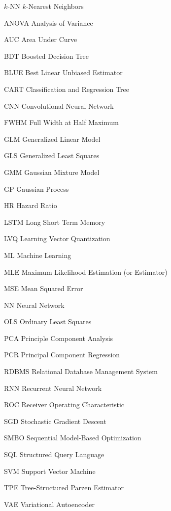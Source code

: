 \begin{symbollist}
	\item[$k$-NN] $k$-Nearest Neighbors
	\item[ANOVA] Analysis of Variance
	\item[AUC] Area Under Curve
	\item[BDT] Boosted Decision Tree
	\item[BLUE] Best Linear Unbiased Estimator
	\item[CART] Classification and Regression Tree
	\item[CNN] Convolutional Neural Network
	\item[FWHM] Full Width at Half Maximum
	\item[GLM] Generalized Linear Model
	\item[GLS] Generalized Least Squares
	\item[GMM] Gaussian Mixture Model
	\item[GP] Gaussian Process
	\item[HR] Hazard Ratio
	\item[LSTM] Long Short Term Memory
	\item[LVQ] Learning Vector Quantization
	\item[ML] Machine Learning
	\item[MLE] Maximum Likelihood Estimation (or Estimator)
	\item[MSE] Mean Squared Error
	\item[NN] Neural Network
	\item[OLS] Ordinary Least Squares
	\item[PCA] Principle Component Analysis
	\item[PCR] Principal Component Regression
	\item[RDBMS] Relational Database Management System
	\item[RNN] Recurrent Neural Network
	\item[ROC] Receiver Operating Characteristic
	\item[SGD] Stochastic Gradient Descent
	\item[SMBO] Sequential Model-Based Optimization
	\item[SQL] Structured Query Language
	\item[SVM] Support Vector Machine
	\item[TPE] Tree-Structured Parzen Estimator
	\item[VAE] Variational Autoencoder
\end{symbollist}
